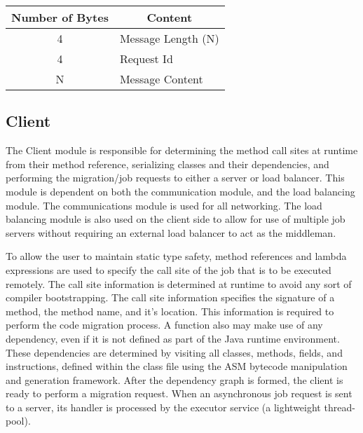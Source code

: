 \begin{minipage}{\linewidth}

    \setlength{\belowcaptionskip}{15pt plus 3pt minus 2pt}
    \begin{tabular}{ c l }
        \hline
        \multicolumn{1}{c}{Number of Bytes} & \multicolumn{1}{c}{Content} \\
        \hline
        4 & Message Length (N) \\
        4 & Request Id \\
        N & Message Content \\
    \end{tabular}

\end{minipage}


\subsection{Client}\label{subsec:client}
The Client module is responsible for determining the method call sites at runtime from their
method reference, serializing classes and their dependencies, and performing the migration/job
requests to either a server or load balancer.
This module is dependent on both the communication module, and the load balancing module.
The communications module is used for all networking.
The load balancing module is also used on the client side to allow for use of multiple
job servers without requiring an external load balancer to act as the middleman.

To allow the user to maintain static type safety, method references and lambda expressions
are used to specify the call site of the job that is to be executed remotely.
The call site information is determined at runtime to avoid any sort of compiler
bootstrapping.
The call site information specifies the signature of a method, the method name, and it's location.
This information is required to perform the code migration process.
A function also may make use of any dependency, even if it is not defined as part of the Java
runtime environment.
These dependencies are determined by visiting all classes, methods, fields, and instructions,
defined within the class file using the ASM bytecode manipulation and generation framework.
After the dependency graph is formed, the client is ready to perform a migration request.
When an asynchronous job request is sent to a server, its handler is processed by the executor service
(a lightweight thread-pool).

